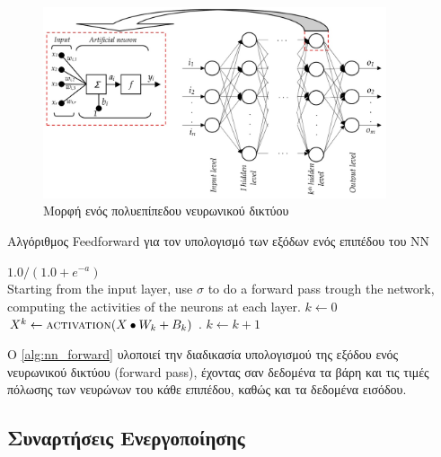 \begin{figure}[!ht]
  \centering
  \includegraphics[width=0.9\textwidth]{./images/chapter3/multilayer_nn.jpg}
  \caption[Μορφή ενός πολυεπίπεδου νευρωνικού δικτύου]{Μορφή ενός πολυεπίπεδου νευρωνικού δικτύου}
  \label{fig:multilayer_nn}
\end{figure}

\begin{algorithm}[!htp]
  \caption{Αλγόριθμος Feedforward για τον υπολογισμό των εξόδων ενός επιπέδου του ΝΝ}
  \label{alg:nn_forward}
  \begin{algorithmic}[1]
      \State \Return $1.0 / (1.0 + e^{-a})$
    \EndFunction \\
      \State Starting from the input layer, use $\sigma$ to do
         a forward pass trough the network, computing the activities of the
        neurons at each layer.
      \State $k \gets 0$
      \State $X^{k} \gets \Call{activation}{X \bullet W_{k} + B_{k}}$  .
        \State $k \gets k+1$
      \EndWhile
    \EndProcedure
  \end{algorithmic}
\end{algorithm}

Ο \autoref{alg:nn_forward} υλοποιεί την διαδικασία υπολογισμού της εξόδου
ενός νευρωνικού δικτύου (forward pass), έχοντας σαν δεδομένα τα βάρη και τις τιμές πόλωσης
των νευρώνων του κάθε επιπέδου, καθώς και τα δεδομένα εισόδου.


\subsection{Συναρτήσεις Ενεργοποίησης}
\label{subsec:activations}

